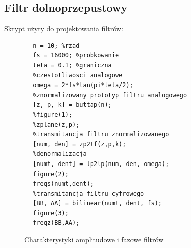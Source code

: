\documentclass[12pt,titlepage]{report}
\begin{document}
\subsection{Filtr dolnoprzepustowy}
Skrypt użyty do projektowania filtrów:
\begin{multicols}{2}
	{
		\tiny
		\begin{verbatim}
		n = 10; %rzad
		fs = 16000; %probkowanie
		teta = 0.1; %graniczna
		%czestotliwosci analogowe
		omega = 2*fs*tan(pi*teta/2);
		%znormalizowany prototyp filtru analogowego
		[z, p, k] = buttap(n);
		%figure(1);
		%zplane(z,p);
		%transmitancja filtru znormalizowanego
		[num, den] = zp2tf(z,p,k);
		%denormalizacja
		[numt, dent] = lp2lp(num, den, omega);
		figure(2);
		freqs(numt,dent);
		%transmitancja filtru cyfrowego
		[BB, AA] = bilinear(numt, dent, fs);
		figure(3);
		freqz(BB,AA);
		\end{verbatim}
	}
\end{multicols}
\begin{figure}[!h]
	\centering
	\caption{Charakterystyki amplitudowe i fazowe filtrów}
\end{figure}
\end{document}
